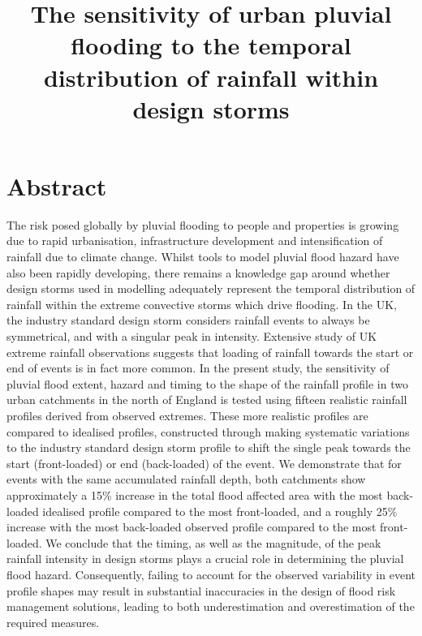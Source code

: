 \documentclass[APA,Times2COL]{WileyNJDv5}
\title{\textbf{The sensitivity of urban pluvial flooding to the temporal distribution of rainfall within design storms}}
\date{}
\begin{document}
\maketitle
\vspace{-1.5cm}

\section{Abstract}


The risk posed globally by pluvial flooding to people and properties is growing due to rapid urbanisation, infrastructure development and intensification of rainfall due to climate change. Whilst tools to model pluvial flood hazard have also been rapidly developing, there remains a knowledge gap around whether design storms used in modelling adequately represent the temporal distribution of rainfall within the extreme convective storms which drive flooding.  In the UK, the industry standard design storm considers rainfall events to always be symmetrical, and with a singular peak in intensity. Extensive study of UK extreme rainfall observations suggests that loading of rainfall towards the start or end of events is in fact more common. In the present study, the sensitivity of pluvial flood extent, hazard and timing to the shape of the rainfall profile in two urban catchments in the north of England is tested using fifteen realistic rainfall profiles derived from observed extremes. These more realistic profiles are compared to idealised profiles, constructed through making systematic variations to the industry standard design storm profile to shift the single peak towards the start (front-loaded) or end (back-loaded) of the event. We demonstrate that for events with the same accumulated rainfall depth, both catchments show approximately a 15\% increase in the total flood affected area with the most back-loaded idealised profile compared to the most front-loaded, and a roughly 25\% increase with the most back-loaded observed profile compared to the most front-loaded. We conclude that the timing, as well as the magnitude, of the peak rainfall intensity in design storms plays a crucial role in determining the pluvial flood hazard. Consequently, failing to account for the observed variability in event profile shapes may result in substantial inaccuracies in the design of flood risk management solutions, leading to both underestimation and overestimation of the required measures. 
\end{document}
